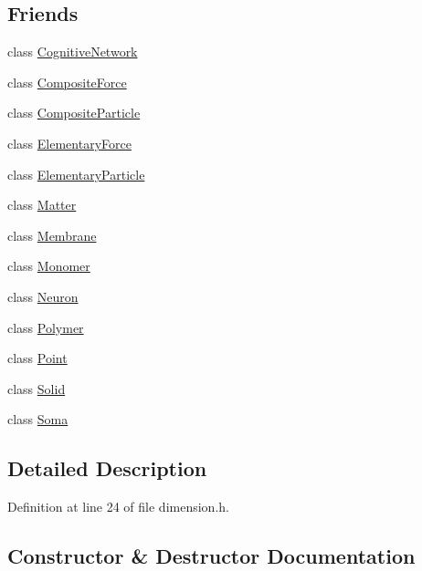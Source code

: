 \subsection*{Friends}
\begin{DoxyCompactItemize}
\item 
class \hyperlink{class_dimension_ad04bbaef84caa0d408ec09a1c1302f5f}{Cognitive\+Network}
\item 
class \hyperlink{class_dimension_a1dacbeca8e464bdc533a40a1b18f33b2}{Composite\+Force}
\item 
class \hyperlink{class_dimension_a8be5cf46db5f9876c49d58e4ab84044b}{Composite\+Particle}
\item 
class \hyperlink{class_dimension_a6e57500586e9cd366f5cf76ea0299957}{Elementary\+Force}
\item 
class \hyperlink{class_dimension_af2ace341c1d7ccd30de3502502773591}{Elementary\+Particle}
\item 
class \hyperlink{class_dimension_a01ab5ef28c10ff1c9ed0c618fa044aea}{Matter}
\item 
class \hyperlink{class_dimension_ac790db405644a01723104c3c0c8128bb}{Membrane}
\item 
class \hyperlink{class_dimension_a9175d4e959674956ccb487d060bac93f}{Monomer}
\item 
class \hyperlink{class_dimension_aa410d74ba34b18a9f6bdf24323c4ee5b}{Neuron}
\item 
class \hyperlink{class_dimension_ae64ddc1700c5abc4106cbcc5843a4a42}{Polymer}
\item 
class \hyperlink{class_dimension_aa238d52f825b8ea8da6a5c4ae1b8d482}{Point}
\item 
class \hyperlink{class_dimension_a5636b9113fd1246b3392dd52b3138229}{Solid}
\item 
class \hyperlink{class_dimension_aaa07b7b364b620b9a781f30a5cd9f5ea}{Soma}
\end{DoxyCompactItemize}


\subsection{Detailed Description}


Definition at line 24 of file dimension.\+h.



\subsection{Constructor \& Destructor Documentation}
\mbox{\label{class_dimension_aa61dad15f33b6c3d09028ba9e545aa70}} 
